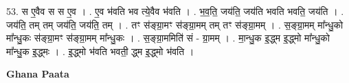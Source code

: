 \documentclass[17pt]{extarticle}
\begin{document}
53. स ए॒वैव स स ए॒व । . ए॒व भ॑वति भव त्ये॒वैव भ॑वति । . भ॒व॒ति॒ जय॑ति॒ जय॑ति भवति भवति॒ जय॑ति । . जय॑ति॒ तम् तम् जय॑ति॒ जय॑ति॒ तम् । . तꣳ स॑ङ्ग्रा॒मꣳ स॑ङ्ग्रा॒मम् तम् तꣳ स॑ङ्ग्रा॒मम् । . स॒ङ्ग्रा॒मम् मा᳚न्धु॒को मा᳚न्धु॒कः स॑ङ्ग्रा॒मꣳ स॑ङ्ग्रा॒मम् मा᳚न्धु॒कः । . स॒ङ्ग्रा॒ममिति॑ सं - ग्रा॒मम् । . मा॒न्धु॒क इ॒द्ध्म इ॒द्ध्मो मा᳚न्धु॒को मा᳚न्धु॒क इ॒द्ध्मः । . इ॒द्ध्मो भ॑वति भवती॒ द्ध्म इ॒द्ध्मो भ॑वति । \newline

\textbf{Ghana Paata } \newline
\end{document}
